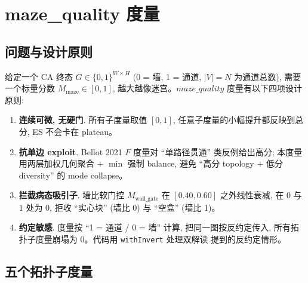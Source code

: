 
\section{maze\_quality 度量}
\label{sec:mazequality}

\subsection{问题与设计原则}

给定一个 CA 终态 $G \in \{0,1\}^{W \times H}$ (0 = 墙, 1 = 通道, $|V| = N$ 为通道总数), 需要一个标量分数 $M_{\text{maze}} \in [0, 1]$, 越大越像迷宫。$maze\_quality$ 度量有以下四项设计原则:
\begin{enumerate}[leftmargin=*, itemsep=0pt, topsep=0pt]
  \item \textbf{连续可微, 无硬门}. 所有子度量取值 $[0, 1]$, 任意子度量的小幅提升都反映到总分, ES 不会卡在 plateau。
  \item \textbf{抗单边 exploit}. Bellot 2021 $F$ 度量对 ``单路径贯通'' 类反例给出高分; 本度量用两层加权几何聚合 + $\min$ 强制 balance, 避免 ``高分 topology + 低分 diversity'' 的 mode collapse。
  \item \textbf{拦截病态吸引子}. 墙比软门控 $M_{\text{wall\_gate}}$ 在 $[0.40, 0.60]$ 之外线性衰减, 在 $0$ 与 $1$ 处为 0, 拒收 ``实心块'' (墙比 0) 与 ``空盒'' (墙比 1)。
  \item \textbf{约定敏感}. 度量按 ``1 = 通道 / 0 = 墙'' 计算, 把同一图按反约定传入, 所有拓扑子度量崩塌为 0。代码用 \texttt{withInvert} 处理双解读 \cite{bellot2021} 提到的反约定情形。
\end{enumerate}

\subsection{五个拓扑子度量}

